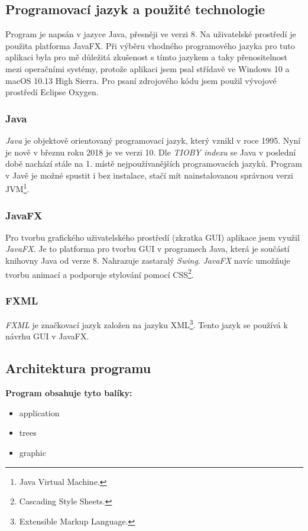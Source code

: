 \documentclass[
  biblatex=false,
  font=serif,
  glossaries=false,
  tables=false,
  theorems=false,
  index
]{kidiplom}
\begin{document}
\subsection{Programovací jazyk a použité technologie}
\indent\indent Program je napsán v jazyce Java, přesněji ve verzi 8. Na uživatelské prostředí je použita platforma JavaFX. Při výběru vhodného programového jazyka pro tuto aplikaci byla pro mě důležitá zkušenost s tímto jazykem a taky přenositelnost mezi operačními systémy, protože aplikaci jsem psal střídavě ve Windows 10 a macOS 10.13 High Sierra. Pro psaní zdrojového kódu jsem použil vývojové prostředí Eclipse Oxygen.

\subsubsection{Java}
\indent\indent \textit{Java} je objektově orientovaný programovací jazyk, který vznikl v roce 1995. Nyní je nově v březnu roku 2018 je ve verzi 10. Dle \textit{TIOBY indexu} se Java v poslední době nachází stále na 1. místě nejpoužívanějších programovacích jazyků.\cite{tioby} Program v Javě je možné spustit i bez instalace, stačí mít nainstalovanou správnou verzi JVM\footnote{Java Virtual Machine.}.

\subsubsection{JavaFX}
\indent\indent Pro tvorbu grafického uživatelského prostředí (zkratka GUI) aplikace jsem využil \textit{JavaFX}. Je to platforma pro tvorbu GUI v programech Java, která je součástí knihovny Java od verze 8. Nahrazuje zastaralý \textit{Swing}. \textit{JavaFX} navíc umožňuje tvorbu animací a podporuje stylování pomocí CSS\footnote{Cascading Style Sheets.}. 

\subsubsection{FXML}
\indent\indent\textit{FXML} je značkovací jazyk založen na jazyku \textsc{XML}\footnote{Extensible Markup Language.}. Tento jazyk se používá k návrhu GUI v JavaFX.

\subsection{Architektura programu}

\noindent \textbf{Program obsahuje tyto balíky:}
\begin{itemize}
\item application
\item trees
\item graphic
\end{itemize}
\end{document}
